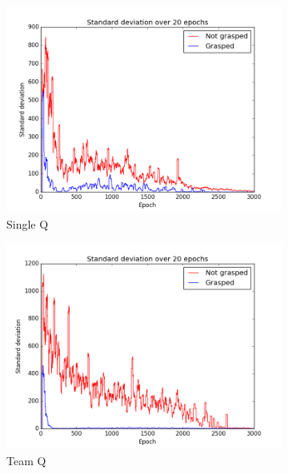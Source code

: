 \begin{figure}
	\centering
	\begin{subfigure}{.48\textwidth}
		\centering
		\includegraphics[width=\textwidth]{images/Stdev_single.png}
		\caption{Single Q}
		\label{3a}
	\end{subfigure}
	\begin{subfigure}{0.48\textwidth}
		\centering
		\includegraphics[width=\textwidth]{images/Stdev_team.png}
		\caption{Team Q}
		\label{3b}		
	\end{subfigure}
	\begin{subfigure}{.48\textwidth}
		\centering

\end{subfigure}
\end{figure}
